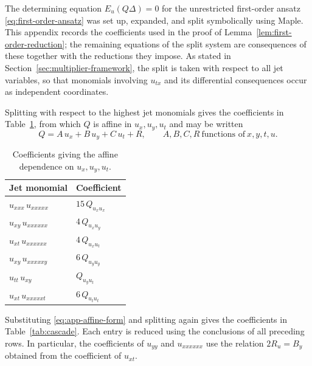 \documentclass[11pt]{article}
\numberwithin{equation}{section}
\theoremstyle{definition}
\theoremstyle{remark}
\begin{document}
The determining equation $E_u(Q\Delta)=0$ for the unrestricted
first-order ansatz \eqref{eq:first-order-ansatz} was set up,
expanded, and split symbolically using Maple. This appendix records the coefficients used in the
proof of Lemma~\ref{lem:first-order-reduction}; the remaining
equations of the split system are consequences of these together with
the reductions they impose. As stated in
Section~\ref{sec:multiplier-framework}, the split is taken with
respect to all jet variables, so that monomials involving $u_{tx}$
and its differential consequences occur as independent coordinates.

Splitting with respect to the highest jet monomials gives the
coefficients in Table~\ref{tab:affine}, from which $Q$ is affine in
$u_x,u_y,u_t$ and may be written
\begin{equation}
Q = A\,u_x + B\,u_y + C\,u_t + R,
\qquad
A,B,C,R \ \text{functions of} \ x,y,t,u .
\label{eq:app-affine-form}
\end{equation}

\begin{table}[h]
\centering
\begin{tabular}{ll}
\hline
Jet monomial & Coefficient \\
\hline
$u_{xxx}\,u_{xxxxx}$ & $15\,Q_{u_xu_x}$ \\
$u_{xy}\,u_{xxxxxx}$ & $4\,Q_{u_xu_y}$ \\
$u_{xt}\,u_{xxxxxx}$ & $4\,Q_{u_xu_t}$ \\
$u_{xy}\,u_{xxxxxy}$ & $6\,Q_{u_yu_y}$ \\
$u_{tt}\,u_{xy}$ & $Q_{u_yu_t}$ \\
$u_{xt}\,u_{xxxxxt}$ & $6\,Q_{u_tu_t}$ \\
\hline
\end{tabular}
\caption{Coefficients giving the affine dependence on
$u_x,u_y,u_t$.}
\label{tab:affine}
\end{table}

Substituting \eqref{eq:app-affine-form} and splitting again gives the
coefficients in Table~\ref{tab:cascade}. Each entry is reduced using
the conclusions of all preceding rows. In particular, the coefficients
of $u_{yy}$ and $u_{xxxxxx}$ use the relation $2R_u=B_y$ obtained
from the coefficient of $u_{xt}$.
\end{document}
